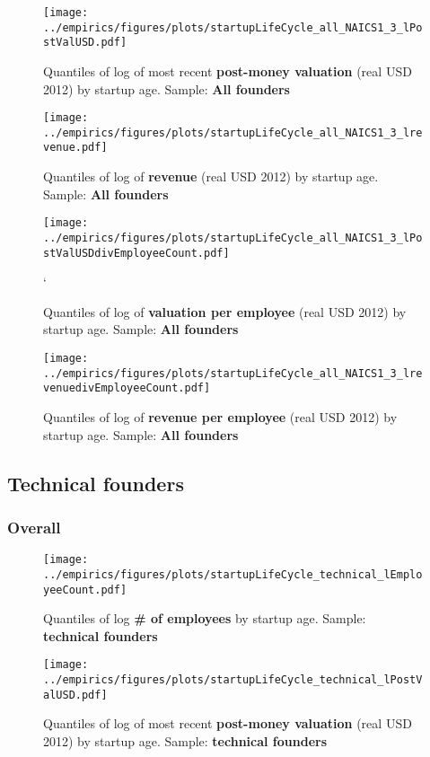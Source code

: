 \documentclass[12pt,english]{article}
\theoremstyle{remark}
\let\Oldsubsection\subsection
\renewcommand{\subsection}{\FloatBarrier\Oldsubsection}
\let\Oldsubsubsection\subsubsection
\renewcommand{\subsubsection}{\FloatBarrier\Oldsubsubsection}
\begin{document}
\begin{figure}[!htb]
	\centering
	\texttt{[image: ../empirics/figures/plots/startupLifeCycle\_all\_NAICS1\_3\_lPostValUSD.pdf]}
	\caption{Quantiles of log of most recent \textbf{post-money valuation} (real USD 2012) by startup age. 
		Sample: \textbf{All founders}}
\end{figure}

\begin{figure}[!htb]
	\centering
	\texttt{[image: ../empirics/figures/plots/startupLifeCycle\_all\_NAICS1\_3\_lrevenue.pdf]}
	\caption{Quantiles of log of \textbf{revenue} (real USD 2012) by startup age. 
		Sample: \textbf{All founders}}
\end{figure}

\begin{figure}[!htb]
	\centering
	\texttt{[image: ../empirics/figures/plots/startupLifeCycle\_all\_NAICS1\_3\_lPostValUSDdivEmployeeCount.pdf]}
	\caption{Quantiles of log of \textbf{valuation per employee} (real USD 2012) by startup age. 
		Sample: \textbf{All founders}}`
\end{figure}

\begin{figure}[!htb]
	\centering
	\texttt{[image: ../empirics/figures/plots/startupLifeCycle\_all\_NAICS1\_3\_lrevenuedivEmployeeCount.pdf]}
	\caption{Quantiles of log of \textbf{revenue per employee} (real USD 2012) by startup age. 
		Sample: \textbf{All founders}}
\end{figure}


\subsection{Technical founders}

\subsubsection{Overall}

\begin{figure}[!htb]
	\centering
	\texttt{[image: ../empirics/figures/plots/startupLifeCycle\_technical\_lEmployeeCount.pdf]}
	\caption{Quantiles of log \textbf{\# of employees} by startup age. 
		Sample: \textbf{technical founders}}
\end{figure}

\begin{figure}[!htb]
	\centering
	\texttt{[image: ../empirics/figures/plots/startupLifeCycle\_technical\_lPostValUSD.pdf]}
	\caption{Quantiles of log of most recent \textbf{post-money valuation} (real USD 2012) by startup age. 
		Sample: \textbf{technical founders}}
\end{figure}
\end{document}

